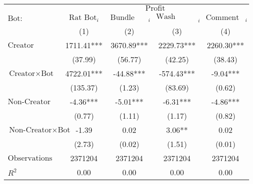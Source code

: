 \begin{tabular}{lcccc}
\hline
 & \multicolumn{4}{c}{$\text{Profit}$} \\
 $\text{Bot}:$ & $\text{Rat Bot}_{i}$ & $\text{Bundle Bot}_{i}$ & $\text{Wash Trading Bot}_{i}$ & $\text{Comment Bot}_{i}$ \\
 & (1) & (2) & (3) & (4)\\
\hline
$\text{Creator}$ & 1711.41*** & 3670.89*** & 2229.73*** & 2260.30*** \\
 & (37.99) & (56.77) & (42.25) & (38.43) \\
$\text{Creator} \times \text{Bot}$ & 4722.01*** & -44.88*** & -574.43*** & -9.04*** \\
 & (135.37) & (1.23) & (83.69) & (0.62) \\
$\text{Non-Creator}$ & -4.36*** & -5.01*** & -6.31*** & -4.86*** \\
 & (0.77) & (1.11) & (1.17) & (0.82) \\
$\text{Non-Creator} \times \text{Bot}$ & -1.39 & 0.02 & 3.06** & 0.02 \\
 & (2.73) & (0.02) & (1.51) & (0.01) \\
$\text{Observations}$ & 2371204 & 2371204 & 2371204 & 2371204 \\
$R^2$ & 0.00 & 0.00 & 0.00 & 0.00 \\
\hline
\end{tabular}